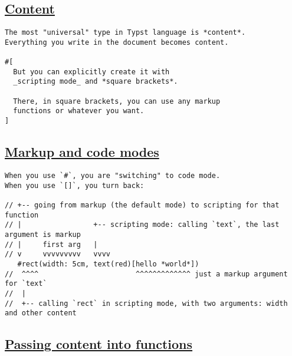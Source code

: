 \pandocbounded{}

\subsection{\texorpdfstring{\hyperref[content]{Content}}{Content}}\label{content}

\begin{verbatim}
The most "universal" type in Typst language is *content*.
Everything you write in the document becomes content.

#[
  But you can explicitly create it with
  _scripting mode_ and *square brackets*.

  There, in square brackets, you can use any markup
  functions or whatever you want.
]
\end{verbatim}

\pandocbounded{}

\subsection{\texorpdfstring{\hyperref[markup-and-code-modes]{Markup and
code modes}}{Markup and code modes}}\label{markup-and-code-modes}

\begin{verbatim}
When you use `#`, you are "switching" to code mode.
When you use `[]`, you turn back:

// +-- going from markup (the default mode) to scripting for that function
// |                 +-- scripting mode: calling `text`, the last argument is markup
// |     first arg   |
// v     vvvvvvvvv   vvvv
   #rect(width: 5cm, text(red)[hello *world*])
//  ^^^^                       ^^^^^^^^^^^^^ just a markup argument for `text`
//  |
//  +-- calling `rect` in scripting mode, with two arguments: width and other content
\end{verbatim}

\pandocbounded{}

\subsection{\texorpdfstring{\hyperref[passing-content-into-functions]{Passing
content into
functions}}{Passing content into functions}}\label{passing-content-into-functions}

